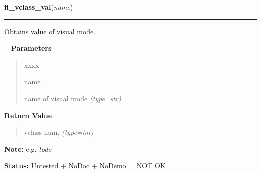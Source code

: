 \hspace{.8\funcindent}\begin{boxedminipage}{\funcwidth}

    \raggedright \textbf{fl\_vclass\_val}(\textit{name})

    \vspace{-1.5ex}

    \rule{\textwidth}{0.5\fboxrule}
\setlength{\parskip}{2ex}

Obtains value of visual mode.

-{}-
\setlength{\parskip}{1ex}
      \textbf{Parameters}
      \vspace{-1ex}

      \begin{quote}
        \begin{Ventry}{xxxx}

          \item[name]


name of visual mode
            {\it (type=str)}

        \end{Ventry}

      \end{quote}

      \textbf{Return Value}
    \vspace{-1ex}

      \begin{quote}

vclass num.
      {\it (type=int)}

      \end{quote}

\textbf{Note:} 
e.g. \emph{todo}


\textbf{Status:} 
Untested + NoDoc + NoDemo = NOT OK


    \end{boxedminipage}

    \label{xformslib:flxbasic:fl_set_ul_property}

    \vspace{0.5ex}


